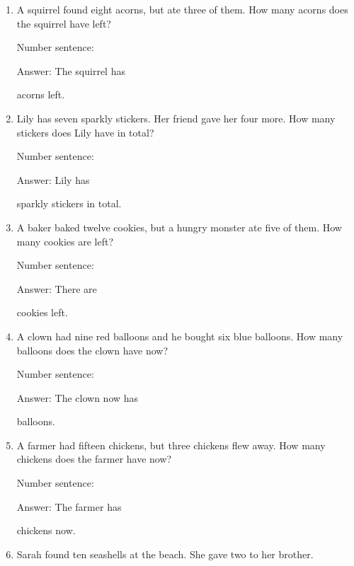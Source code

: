 \documentclass{tufte-book}
\begin{document}
\begin{enumerate}

\item
  A squirrel found eight acorns, but ate three of them. How many acorns
  does the squirrel have left?\medskip\par
  Number sentence:
  \dotfill\medskip\par
  Answer: The squirrel has
  \dotfill\medskip\par\mbox{}\dotfill\medskip\par\mbox{}\dotfill\bigskip
  acorns left.
\item
  Lily has seven sparkly stickers. Her friend gave her four more. How
  many stickers does Lily have in total?\medskip\par
  Number sentence:
  \dotfill\medskip\par
  Answer: Lily has
  \dotfill\medskip\par\mbox{}\dotfill\medskip\par\mbox{}\dotfill\bigskip
  sparkly stickers in total.
\item
  A baker baked twelve cookies, but a hungry monster ate five of them.
  How many cookies are left?\medskip\par
  Number sentence:
  \dotfill\medskip\par
  Answer: There are
  \dotfill\medskip\par\mbox{}\dotfill\medskip\par\mbox{}\dotfill\bigskip
  cookies left.
\item
  A clown had nine red balloons and he bought six blue balloons. How
  many balloons does the clown have now?\medskip\par
  Number sentence:
  \dotfill\medskip\par
  Answer: The clown now has
  \dotfill\medskip\par\mbox{}\dotfill\medskip\par\mbox{}\dotfill\bigskip
  balloons.
\item
  A farmer had fifteen chickens, but three chickens flew away. How many
  chickens does the farmer have now?\medskip\par
  Number sentence:
  \dotfill\medskip\par
  Answer: The farmer has
  \dotfill\medskip\par\mbox{}\dotfill\medskip\par\mbox{}\dotfill\bigskip
  chickens now.
\item
  Sarah found ten seashells at the beach. She gave two to her brother.

\end{enumerate}
\end{document}
